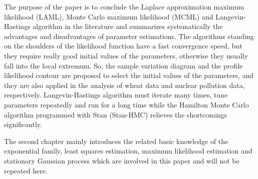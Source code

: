 \documentclass[12pt,a4paper,UTF8,twoside]{book}
\begin{document}
The purpose of the paper is to conclude the Laplace approximation
maximum likelihood (LAML), Monte Carlo maximum likelihood (MCML) and
Langevin-Hastings algorithm in the literature and summarizes
systematically the advantages and disadvantages of parameter
estimations. The algorithms standing on the shoulders of the likelihood
function have a fast convergence speed, but they require really good
initial values of the parameters, otherwise they usually fall into the
local extremum. So, the sample variation diagram and the profile
likelihood contour are proposed to select the initial values of the
parameters, and they are also applied in the analysis of wheat data and
nuclear pollution data, respectively. Langevin-Hastings algorithm must
iterate many times, tune parameters repeatedly and run for a long time
while the Hamilton Monte Carlo algorithm programmed with Stan (Stan-HMC)
relieves the shortcomings significantly.

The second chapter mainly introduces the related basic knowledge of the
exponential family, least squares estimation, maximum likelihood
estimation and stationary Gaussian process which are involved in this
paper and will not be repeated here.
\end{document}
